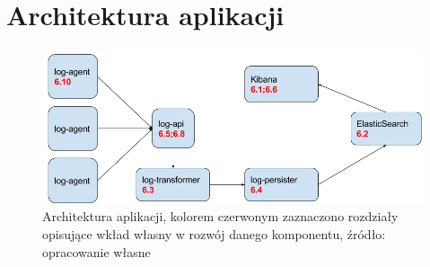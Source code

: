 \section{Architektura aplikacji}
\label{chapter:application:architecture}

\begin{figure}[H]
    \centering
    \includegraphics[width=1.0\textwidth]{images/application_arch_with_refs}
    \caption[Architektura aplikacji]{
        Architektura aplikacji, kolorem czerwonym zaznaczono rozdziały opisujące
        wkład własny w rozwój danego komponentu, źródło: opracowanie własne
    }
    \label{chapter:application:architecture:diagram}
\end{figure}

